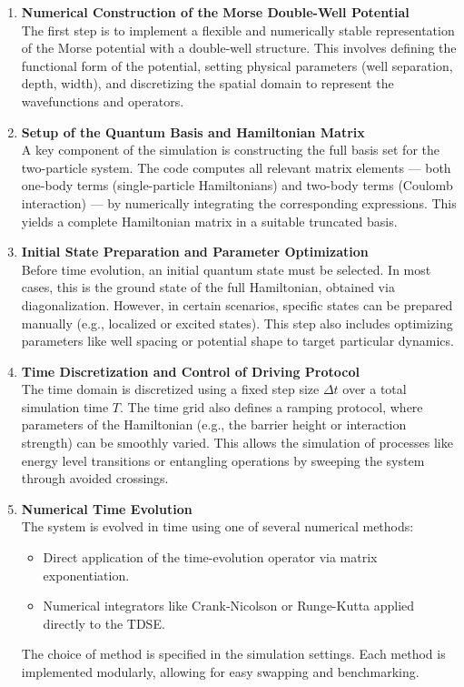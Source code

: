 \documentclass{subfiles}
\begin{document}
\begin{enumerate}
    \item \textbf{Numerical Construction of the Morse Double-Well Potential} \\
    The first step is to implement a flexible and numerically stable representation of the Morse potential with a double-well structure. This involves defining the functional form of the potential, setting physical parameters (well separation, depth, width), and discretizing the spatial domain to represent the wavefunctions and operators.

    \item \textbf{Setup of the Quantum Basis and Hamiltonian Matrix} \\
    A key component of the simulation is constructing the full basis set for the two-particle system. The code computes all relevant matrix elements — both one-body terms (single-particle Hamiltonians) and two-body terms (Coulomb interaction) — by numerically integrating the corresponding expressions. This yields a complete Hamiltonian matrix in a suitable truncated basis.

    \item \textbf{Initial State Preparation and Parameter Optimization} \\
    Before time evolution, an initial quantum state must be selected. In most cases, this is the ground state of the full Hamiltonian, obtained via diagonalization. However, in certain scenarios, specific states can be prepared manually (e.g., localized or excited states). This step also includes optimizing parameters like well spacing or potential shape to target particular dynamics.

    \item \textbf{Time Discretization and Control of Driving Protocol} \\
    The time domain is discretized using a fixed step size $\Delta t$ over a total simulation time $T$. The time grid also defines a ramping protocol, where parameters of the Hamiltonian (e.g., the barrier height or interaction strength) can be smoothly varied. This allows the simulation of processes like energy level transitions or entangling operations by sweeping the system through avoided crossings.

    \item \textbf{Numerical Time Evolution} \\
    The system is evolved in time using one of several numerical methods:
    \begin{itemize}
        \item Direct application of the time-evolution operator via matrix exponentiation.
        \item Numerical integrators like Crank-Nicolson or Runge-Kutta applied directly to the TDSE.
    \end{itemize}
    The choice of method is specified in the simulation settings. Each method is implemented modularly, allowing for easy swapping and benchmarking.


\end{enumerate}
\end{document}
